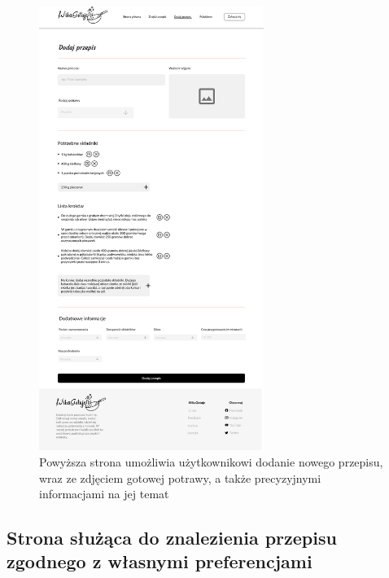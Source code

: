 \documentclass{article}
\begin{document}
\begin{figure}[H]
    \begin{center}
        \includegraphics[width=0.65\textwidth]{mockups/adding_recipe}
    \end{center}
    \caption{Powyższa strona umożliwia użytkownikowi dodanie nowego przepisu, wraz ze zdjęciem gotowej potrawy, a także precyzyjnymi informacjami na jej temat}
    \label{fig:add_recipe}
\end{figure}

\newpage

\subsection{Strona służąca do znalezienia przepisu zgodnego z własnymi preferencjami}
\end{document}
